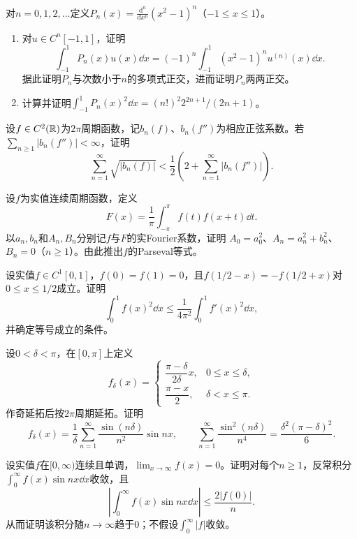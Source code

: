 对$n=0,1,2,\ldots$定义$P_n(x)=\frac{\mathrm d^n}{\mathrm dx^n}(x^2-1)^n$（$-1\le x\le1$）。
\begin{enumerate}[label=(\arabic*)]
\item 对$u\in C^n[-1,1]$，证明
\[
 \int_{-1}^1P_n(x)u(x)\dd x=(-1)^n\int_{-1}^1(x^2-1)^n u^{(n)}(x)\dd x.
\]
据此证明$P_n$与次数小于$n$的多项式正交，进而证明$P_n$两两正交。
\item 计算并证明$\int_{-1}^1P_n(x)^2\dd x=(n!)^2 2^{2n+1}/(2n+1)$。
\end{enumerate}

设$f\in C^2(\mathbb R)$为$2\pi$周期函数，记$b_n(f)$、$b_n(f'')$为相应正弦系数。若$\sum_{n\ge1}|b_n(f'')|<\infty$，证明
\[
 \sum_{n=1}^{\infty}\sqrt{|b_n(f)|}
 <\frac12\left(2+\sum_{n=1}^{\infty}|b_n(f'')|\right).
\]

设$f$为实值连续周期函数，定义
\[
 F(x)=\frac1\pi\int_{-\pi}^{\pi}f(t)f(x+t)\dd t.
\]
以$a_n,b_n$和$A_n,B_n$分别记$f$与$F$的实Fourier系数，证明
$A_0=a_0^2$、$A_n=a_n^2+b_n^2$、$B_n=0$（$n\ge1$）。由此推出$f$的Parseval等式。

设实值$f\in C^1[0,1]$，$f(0)=f(1)=0$，且$f(1/2-x)=-f(1/2+x)$对$0\le x\le1/2$成立。证明
\[
 \int_0^1 f(x)^2\dd x\le\frac1{4\pi^2}\int_0^1 f'(x)^2\dd x,
\]
并确定等号成立的条件。

设$0<\delta<\pi$，在$[0,\pi]$上定义
\[
 f_\delta(x)=\begin{cases}\dfrac{\pi-\delta}{2\delta}x,&0\le x\le\delta,\\[3pt]\dfrac{\pi-x}{2},&\delta<x\le\pi.\end{cases}
\]
作奇延拓后按$2\pi$周期延拓。证明
\[
 f_\delta(x)=\frac1\delta\sum_{n=1}^{\infty}\frac{\sin(n\delta)}{n^2}\sin nx,
 \qquad\sum_{n=1}^{\infty}\frac{\sin^2(n\delta)}{n^4}=\frac{\delta^2(\pi-\delta)^2}{6}.
\]

设实值$f$在$[0,\infty)$连续且单调，$\lim_{x\to\infty}f(x)=0$。证明对每个$n\ge1$，反常积分$\int_0^\infty f(x)\sin nx\dd x$收敛，且
\[
 \left|\int_0^\infty f(x)\sin nx\dd x\right|\le\frac{2|f(0)|}{n}.
\]
从而证明该积分随$n\to\infty$趋于$0$；不假设$\int_0^\infty|f|$收敛。

